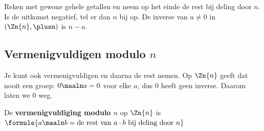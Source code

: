
\begin{werkwijze}
Reken met gewone gehele getallen en neem op het einde de rest bij deling door $n$. Is de uitkomst negatief, tel er dan $n$ bij op. De inverse van $a \neq 0$ in $(\Zn{n}, \plusn)$ is $n - a$.
\end{werkwijze}

\subsection{Vermenigvuldigen modulo \texorpdfstring{$n$}{n}}

Je kunt ook vermenigvuldigen en daarna de rest nemen. Op $\Zn{n}$ geeft dat nooit een groep: $0 \maaln a = 0$ voor elke $a$, dus 0 heeft geen inverse. Daarom laten we 0 weg.

\begin{theorie}
De \textbf{\textcolor{accent}{vermenigvuldiging modulo $n$}} op $\Zn{n}$ is \quad $\formule{a \maaln b = \text{de rest van } a \cdot b \text{ bij deling door } n}$
\end{theorie}

